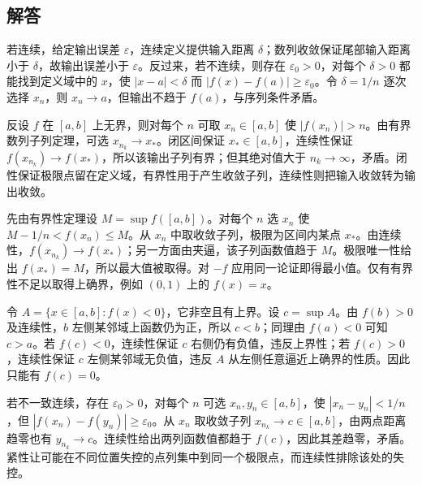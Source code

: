 \documentclass[UTF8,12pt,a4paper,fontset=fandol]{ctexart}
\begin{document}
\subsection{解答}
\begin{solve}\label{ans:c7q1}
若连续，给定输出误差 $\varepsilon$，连续定义提供输入距离 $\delta$；数列收敛保证尾部输入距离小于 $\delta$，故输出误差小于 $\varepsilon$。反过来，若不连续，则存在 $\varepsilon_0>0$，对每个 $\delta>0$ 都能找到定义域中的 $x$，使 $|x-a|<\delta$ 而 $|f(x)-f(a)|\ge\varepsilon_0$。令 $\delta=1/n$ 逐次选择 $x_n$，则 $x_n\to a$，但输出不趋于 $f(a)$，与序列条件矛盾。
\end{solve}

\begin{solve}\label{ans:c7q2}
反设 $f$ 在 $[a,b]$ 上无界，则对每个 $n$ 可取 $x_n\in[a,b]$ 使 $|f(x_n)|>n$。由有界数列子列定理，可选 $x_{n_k}\to x_*$。闭区间保证 $x_*\in[a,b]$，连续性保证 $f(x_{n_k})\to f(x_*)$，所以该输出子列有界；但其绝对值大于 $n_k\to\infty$，矛盾。闭性保证极限点留在定义域，有界性用于产生收敛子列，连续性则把输入收敛转为输出收敛。
\end{solve}

\begin{solve}\label{ans:c7q3}
先由有界性定理设 $M=\sup f([a,b])$。对每个 $n$ 选 $x_n$ 使 $M-1/n<f(x_n)\le M$。从 $x_n$ 中取收敛子列，极限为区间内某点 $x_*$。由连续性，$f(x_{n_k})\to f(x_*)$；另一方面由夹逼，该子列函数值趋于 $M$。极限唯一性给出 $f(x_*)=M$，所以最大值被取得。对 $-f$ 应用同一论证即得最小值。仅有有界性不足以取得上确界，例如 $(0,1)$ 上的 $f(x)=x$。
\end{solve}

\begin{solve}\label{ans:c7q4}
令 $A=\{x\in[a,b]:f(x)<0\}$，它非空且有上界。设 $c=\sup A$。由 $f(b)>0$ 及连续性，$b$ 左侧某邻域上函数仍为正，所以 $c<b$；同理由 $f(a)<0$ 可知 $c>a$。若 $f(c)<0$，连续性保证 $c$ 右侧仍有负值，违反上界性；若 $f(c)>0$，连续性保证 $c$ 左侧某邻域无负值，违反 $A$ 从左侧任意逼近上确界的性质。因此只能有 $f(c)=0$。
\end{solve}

\begin{solve}\label{ans:c7q5}
若不一致连续，存在 $\varepsilon_0>0$，对每个 $n$ 可选 $x_n,y_n\in[a,b]$，使 $|x_n-y_n|<1/n$，但 $|f(x_n)-f(y_n)|\ge\varepsilon_0$。从 $x_n$ 取收敛子列 $x_{n_k}\to c\in[a,b]$，由两点距离趋零也有 $y_{n_k}\to c$。连续性给出两列函数值都趋于 $f(c)$，因此其差趋零，矛盾。紧性让可能在不同位置失控的点列集中到同一个极限点，而连续性排除该处的失控。
\end{solve}
\end{document}
